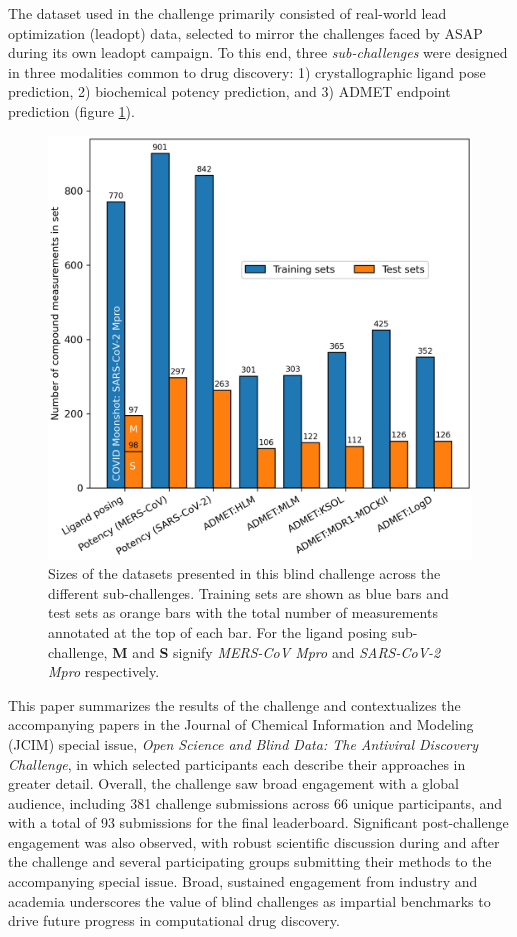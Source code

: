 \documentclass[journal=jcim,manuscript=article]{achemso}
\begin{document}
The dataset used in the challenge primarily consisted of real-world lead optimization (leadopt) data, selected to mirror the challenges faced by ASAP during its own leadopt campaign. To this end, three \textit{sub-challenges} were designed in three modalities common to drug discovery: 1) crystallographic ligand pose prediction, 2) biochemical potency prediction, and 3) ADMET endpoint prediction (figure \ref{fgr:datasets_overview}).


\begin{figure}
    \includegraphics[scale=0.5]{01_figs_introduction/datasets_overview.png}
  \caption{Sizes of the datasets presented in this blind challenge across the different sub-challenges. Training sets are shown as blue bars and test sets as orange bars with the total number of measurements annotated at the top of each bar. For the ligand posing sub-challenge, \textbf{M} and \textbf{S} signify \textit{MERS-CoV Mpro} and \textit{SARS-CoV-2 Mpro} respectively. }
  \label{fgr:datasets_overview}
\end{figure}


This paper summarizes the results of the challenge and contextualizes the accompanying papers in the Journal of Chemical Information and Modeling (JCIM) special issue, \textit{Open Science and Blind Data: The Antiviral Discovery Challenge}, in which selected participants each describe their approaches in greater detail. Overall, the challenge saw broad engagement with a global audience, including 381 challenge submissions across 66 unique participants, and with a total of 93 submissions for the final leaderboard. Significant post-challenge engagement was also observed, with robust scientific discussion during and after the challenge and several participating groups submitting their methods to the accompanying special issue. Broad, sustained engagement from industry and academia underscores the value of blind challenges as impartial benchmarks to drive future progress in computational drug discovery. 
\end{document}
